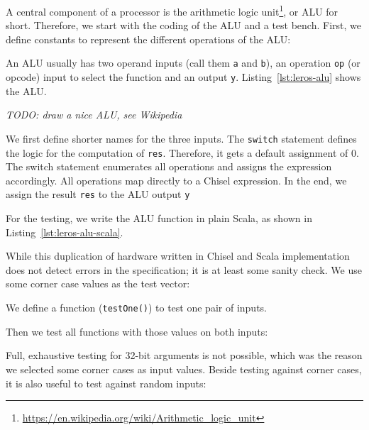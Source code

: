 \documentclass[%
    10pt,
    headinclude, footexclude,
    openright, %
    notitlepage,
    cleardoubleempty,
    headsepline,
    pointlessnumbers,
    bibtotoc, idxtotoc,
    ]{scrbook}
\newcommand{\code}[1]{{\small{\texttt{#1}}}}
\newcommand{\todo}[1]{{\emph{TODO: #1}}}
\newcommand{\myref}[2]{\href{#1}{#2}}
\renewcommand{\myref}[2]{{#2}{\footnote{\url{#1}}}}
\begin{document}

A central component of a processor is the
\myref{https://en.wikipedia.org/wiki/Arithmetic_logic_unit}{arithmetic logic unit}, or ALU for short.
Therefore, we start with the coding of the ALU and a test bench.
First, we define constants to represent the different operations of the ALU:


\noindent An ALU usually has two operand inputs (call them \code{a} and \code{b}), an operation \code{op}
(or opcode) input to select the function and an output \code{y}.
Listing~\ref{lst:leros-alu} shows the ALU.

\todo{draw a nice ALU, see Wikipedia}



We first define shorter names for the three inputs. The \code{switch} statement defines the
logic for the computation of \code{res}. Therefore, it gets a default assignment of 0.
The switch statement enumerates all operations and assigns the expression accordingly.
All operations map directly to a Chisel expression.
In the end, we assign the result \code{res} to the ALU output \code{y}


For the testing, we write the ALU function in plain Scala, as shown in Listing~\ref{lst:leros-alu-scala}.


\noindent While this duplication of hardware written in Chisel and Scala implementation does not
detect errors in the specification; it is at least some sanity check.
We use some corner case values as the test vector:

\newpage
{}

\noindent We define a function (\code{testOne()}) to test one pair of inputs.

\noindent Then we test all functions with those values on both inputs:


\noindent Full, exhaustive testing for 32-bit arguments is not possible, which was the reason we
selected some corner cases as input values. Beside testing against corner cases, it is also useful
to test against random inputs:
\end{document}
